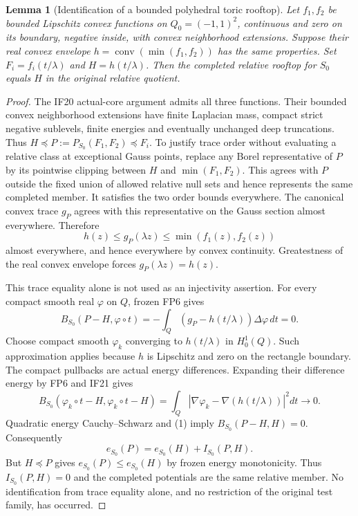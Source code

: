 \documentclass{article}
\newtheorem{lemma}{Lemma}
\begin{document}
\begin{lemma}[Identification of a bounded polyhedral toric rooftop]
Let $f_1,f_2$ be bounded Lipschitz convex functions on
$Q_0=(-1,1)^2$, continuous and zero on its boundary, negative inside,
with convex neighborhood extensions. Suppose their real convex envelope
$h=\operatorname{conv}(\min(f_1,f_2))$ has the same properties. Set
$F_i=f_i(t/\lambda)$ and $H=h(t/\lambda)$. Then the completed relative
rooftop for $S_0$ equals $H$ in the original relative quotient.
\end{lemma}
\begin{proof}
The IF20 actual-core argument admits all three functions. Their bounded
convex neighborhood extensions have finite Laplacian mass, compact strict
negative sublevels, finite energies and eventually unchanged deep
truncations. Thus $H\preceq P:=P_{S_0}(F_1,F_2)\preceq F_i$.
To justify trace order without evaluating a relative class at exceptional
Gauss points, replace any Borel representative of $P$ by its pointwise
clipping between $H$ and $\min(F_1,F_2)$. This agrees with $P$ outside
the fixed union of allowed relative null sets and hence represents the
same completed member. It satisfies the two order bounds everywhere.
The canonical convex trace $g_P$ agrees with this representative on the
Gauss section almost everywhere. Therefore
\[
 h(z)\le g_P(\lambda z)\le\min(f_1(z),f_2(z))
\]
almost everywhere, and hence everywhere by convex continuity. Greatestness
of the real convex envelope forces $g_P(\lambda z)=h(z)$.

This trace equality alone is not used as an injectivity assertion.
For every compact smooth real $\varphi$ on $Q$, frozen FP6 gives
\[
 B_{S_0}(P-H,\varphi\circ t)
       =-\int_Q(g_P-h(t/\lambda))\Delta\varphi\,dt=0.       \tag{1}
\]
Choose compact smooth $\varphi_k$ converging to $h(t/\lambda)$ in
$H_0^1(Q)$. Such approximation applies because $h$ is Lipschitz and
zero on the rectangle boundary. The compact pullbacks are actual energy
differences. Expanding their difference energy by FP6 and IF21 gives
\[
 B_{S_0}(\varphi_k\circ t-H,\varphi_k\circ t-H)
       =\int_Q|\nabla\varphi_k-\nabla(h(t/\lambda))|^2dt
          \longrightarrow0.                              \tag{2}
\]
Quadratic energy Cauchy--Schwarz and (1) imply $B_{S_0}(P-H,H)=0$.
Consequently
\[
 e_{S_0}(P)=e_{S_0}(H)+I_{S_0}(P,H).
\]
But $H\preceq P$ gives $e_{S_0}(P)\le e_{S_0}(H)$ by frozen energy
monotonicity. Thus $I_{S_0}(P,H)=0$ and the completed potentials are
the same relative member. No identification from trace equality alone,
and no restriction of the original test family, has occurred.
\end{proof}
\end{document}
